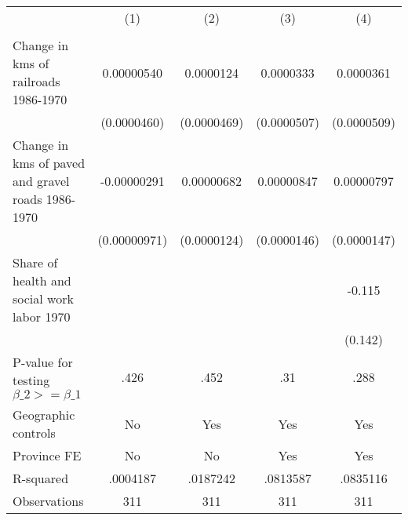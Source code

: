 {
\def\sym#1{\ifmmode^{#1}\else\(^{#1}\)\fi}
\begin{tabular}{l*{4}{c}}
\hline\hline
                &\multicolumn{1}{c}{(1)}&\multicolumn{1}{c}{(2)}&\multicolumn{1}{c}{(3)}&\multicolumn{1}{c}{(4)}\\
                &\multicolumn{1}{c}{}&\multicolumn{1}{c}{}&\multicolumn{1}{c}{}&\multicolumn{1}{c}{}\\
\hline
Change in kms of railroads 1986-1970&0.00000540         &0.0000124         &0.0000333         &0.0000361         \\
                &(0.0000460)         &(0.0000469)         &(0.0000507)         &(0.0000509)         \\
[1em]
Change in kms of paved and gravel roads 1986-1970&-0.00000291         &0.00000682         &0.00000847         &0.00000797         \\
                &(0.00000971)         &(0.0000124)         &(0.0000146)         &(0.0000147)         \\
[1em]
Share of health and social work labor 1970&                  &                  &                  &   -0.115         \\
                &                  &                  &                  &  (0.142)         \\
\hline
P-value for testing $\beta\_{2} >= \beta\_{1}$&     .426         &     .452         &      .31         &     .288         \\
Geographic controls&       No         &      Yes         &      Yes         &      Yes         \\
Province FE     &       No         &       No         &      Yes         &      Yes         \\
R-squared       & .0004187         & .0187242         & .0813587         & .0835116         \\
Observations    &      311         &      311         &      311         &      311         \\
\hline\hline
\end{tabular}
}

